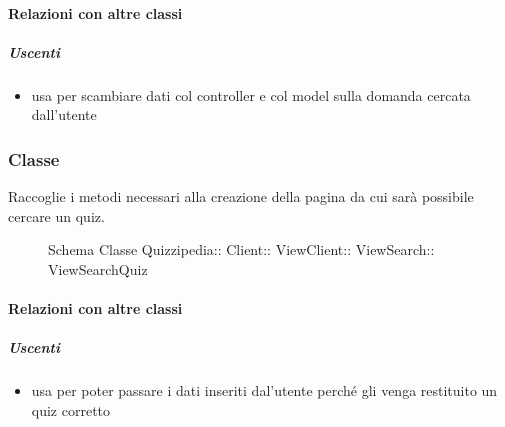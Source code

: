 \paragraph{Relazioni con altre classi}
\subparagraph{Uscenti}
\begin{itemize}
\item usa  per scambiare dati col controller e col model sulla domanda cercata dall'utente
\end{itemize}
\subsubsection{Classe }
Raccoglie i metodi necessari alla creazione della pagina da cui sarà possibile cercare un quiz.
\begin{figure}[H]
\centering
\noindent{}
\caption[Schema Classe ViewSearchQuiz]{Schema Classe Quizzipedia:: Client:: ViewClient:: ViewSearch:: ViewSearchQuiz}
\end{figure}
\paragraph{Relazioni con altre classi}
\subparagraph{Uscenti}
\begin{itemize}
\item usa  per poter passare i dati inseriti dal'utente perché gli venga restituito un quiz corretto
\end{itemize}
